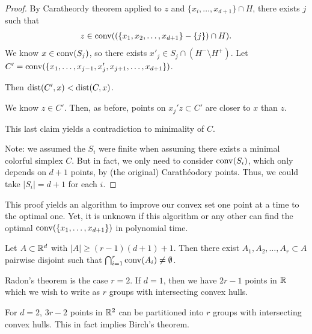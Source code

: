 \begin{proof}
By Caratheordy theorem applied to $z$ and $\{x_i,\dotsc,x_{d+1}\}\cap H$, there exists $j$ such that \begin{align*}	
z\in \operatorname{conv}((\{x_1,x_2,\dotsc,x_{d+1}\}- \{j\})\cap H).
\end{align*}
We know $x\in \operatorname{conv}(S_j)$, so there exists $x'_j \in S_j \cap (H^-\setminus H^+)$. Let $C' = \operatorname{conv}( \{x_1,\dotsc,x_{j-1},x_j',x_{j+1},\dotsc,x_{d+1}\})$.

\begin{claim}
Then $\operatorname{dist}(C',x) < \operatorname{dist}(C,x)$.
\end{claim}
\begin{subproof}	
We know $z\in C'$. Then, as before, points on $x_j' z\subset C'$ are closer to $x$ than $z$. 
\end{subproof}
This last claim yields a contradiction to minimality of $C$.

Note: we assumed the $S_i$ were finite when assuming there exists a minimal colorful simplex $C$. But in fact, we only need to consider $\operatorname{conv}(S_i)$, which only depends on $d+1$ points, by (the original) Carath\'eodory points. Thus, we could take $|S_i|=d+1$ for each $i$.
\end{proof}
\begin{remark}
This proof yields an algorithm to improve our convex set one point at a time to the optimal one. Yet, it is unknown if this algorithm or any other can find the optimal $\operatorname{conv}(\{x_1,\dotsc,x_{d+1}\})$ in polynomial time.
\end{remark}

\begin{theorem}
Let $A\subset \mathbb{R}^d$ with $|A| \geq (r-1)(d+1)+1$. Then there exist $A_1,A_2,\dotsc,A_r\subset A$ pairwise disjoint such that $\bigcap_{i=1}^r \operatorname{conv}(A_i)\neq \emptyset$.
\end{theorem}
\begin{remark}
Radon's theorem is the case $r=2$. If $d=1$, then we have $2r-1$ points in $\mathbb{R}$ which we wish to write as $r$ groups with intersecting convex hulls.

For $d=2$, $3r-2$ points in $\mathbb{R}^2$ can be partitioned into $r$ groups with intersecting convex hulls. This in fact implies Birch's theorem.
\end{remark}

